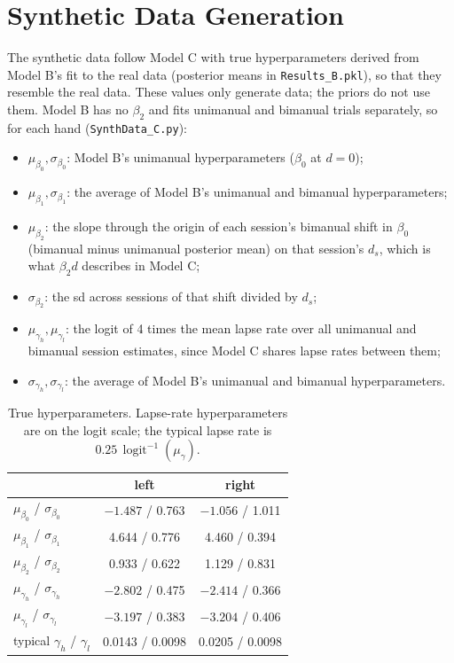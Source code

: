 \documentclass[11pt]{article}
\newcommand{\invlogit}{\operatorname{logit}^{-1}}
\newcommand{\code}[1]{\texttt{#1}}
\begin{document}
\section{Synthetic Data Generation}

The synthetic data follow Model C with true hyperparameters derived from Model B's
fit to the real data (posterior means in \code{Results\_B.pkl}), so that they
resemble the real data. These values only generate data; the priors do not use them.
Model B has no $\beta_2$ and fits unimanual and bimanual trials separately, so for
each hand (\code{SynthData\_C.py}):
\begin{itemize}
  \item $\mu_{\beta_0}, \sigma_{\beta_0}$: Model B's unimanual hyperparameters
        ($\beta_0$ at $d = 0$);
  \item $\mu_{\beta_1}, \sigma_{\beta_1}$: the average of Model B's unimanual and
        bimanual hyperparameters;
  \item $\mu_{\beta_2}$: the slope through the origin of each session's bimanual shift
        in $\beta_0$ (bimanual minus unimanual posterior mean) on that session's
        $d_s$, which is what $\beta_2 d$ describes in Model C;
  \item $\sigma_{\beta_2}$: the sd across sessions of that shift divided by $d_s$;
  \item $\mu_{\gamma_h}, \mu_{\gamma_l}$: the logit of 4 times the mean lapse rate over
        all unimanual and bimanual session estimates, since Model C shares lapse rates
        between them;
  \item $\sigma_{\gamma_h}, \sigma_{\gamma_l}$: the average of Model B's unimanual and
        bimanual hyperparameters.
\end{itemize}

\begin{table}[H]
\centering
\caption{True hyperparameters. Lapse-rate hyperparameters are on the logit scale;
the typical lapse rate is $0.25\,\invlogit(\mu_\gamma)$.}
\label{tab:true}
\begin{tabular}{lcc}
\toprule
 & left & right \\
\midrule
$\mu_{\beta_0}$ / $\sigma_{\beta_0}$ & $-1.487$ / 0.763 & $-1.056$ / 1.011 \\
$\mu_{\beta_1}$ / $\sigma_{\beta_1}$ & 4.644 / 0.776 & 4.460 / 0.394 \\
$\mu_{\beta_2}$ / $\sigma_{\beta_2}$ & 0.933 / 0.622 & 1.129 / 0.831 \\
$\mu_{\gamma_h}$ / $\sigma_{\gamma_h}$ & $-2.802$ / 0.475 & $-2.414$ / 0.366 \\
$\mu_{\gamma_l}$ / $\sigma_{\gamma_l}$ & $-3.197$ / 0.383 & $-3.204$ / 0.406 \\
typical $\gamma_h$ / $\gamma_l$ & 0.0143 / 0.0098 & 0.0205 / 0.0098 \\
\bottomrule
\end{tabular}
\end{table}
\end{document}
